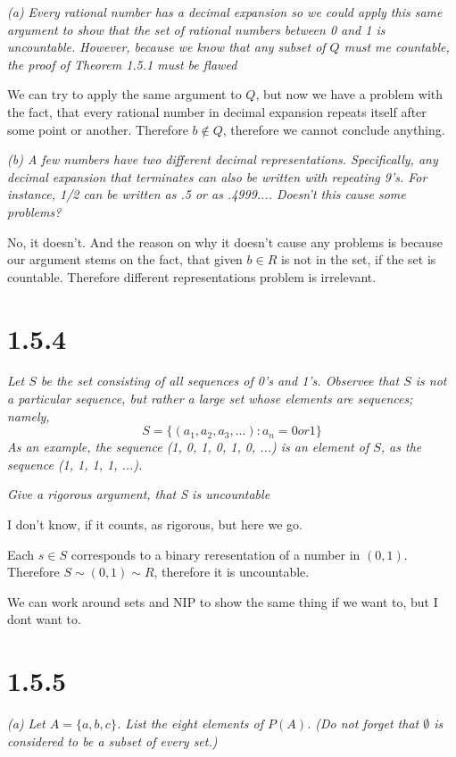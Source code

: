 \documentclass[11pt,oneside,titlepage]{book}
\begin{document}
\textit{(a) Every rational number has a decimal expansion so we could apply
  this same argument to show that the set of rational numbers between 0 and 1
  is uncountable. However, because we know that any subset of $Q$ must me countable,
  the proof of Theorem 1.5.1 must be flawed}

We can try to apply the same argument to $Q$, but now we have a problem with the
fact, that every rational number in decimal expansion repeats itself after some
point or another. Therefore $b \notin Q$, therefore we cannot conclude anything.

\textit{(b) A few numbers have two different decimal representations. Specifically,
  any decimal expansion that terminates can also be written with repeating 9's.
  For instance, 1/2 can be written as .5 or as .4999.... Doesn't this cause some
  problems?}

No, it doesn't. And the reason on why it doesn't cause any problems is because
our argument stems on the fact, that given $b \in R$ is not in the set,
if the set is countable. Therefore different representations problem is irrelevant.

\section*{1.5.4}
\textit{Let $S$ be the set consisting of all sequences of 0's and 1's. Observee that $S$
  is not a particular sequence, but rather a large set whose elements are sequences;
  namely,}
$$S = \{(a_1, a_2, a_3,...): a_n = 0 or 1\}$$
\textit{As an example, the sequence (1, 0, 1, 0, 1, 0, ...) is an element of $S$, as the
  sequence (1, 1, 1, 1, ...).}

\textit{Give a rigorous argument, that S is uncountable}

I don't know, if it counts, as rigorous, but here we go.

Each $s \in S$ corresponds to a binary reresentation of a number in $(0, 1)$. Therefore
$S \sim (0, 1) \sim R$, therefore it is uncountable.

We can work around sets and NIP to show the same thing if we want to, but I dont want to.

\section*{1.5.5}
\textit{(a) Let $A = \{a, b, c\}$. List the eight elements of $P(A)$. (Do not forget that
  $\emptyset$ is considered to be a subset of every set.)}
\end{document}
